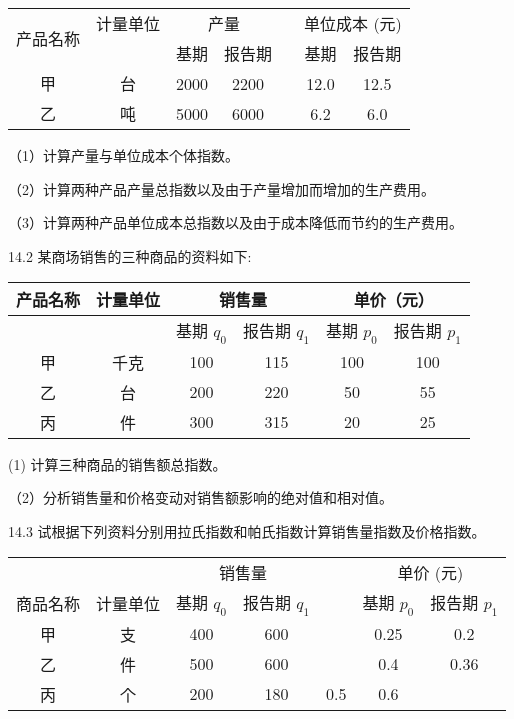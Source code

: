 \documentclass[10pt]{article}
\begin{document}
\begin{CJK*}{UTF8}{bsmi}
\begin{center}
\begin{tabular}{ccccccc}
\hline
\multirow{2}{*}{产品名称} & 计量单位 & \multicolumn{2}{c}{产量} &  & \multicolumn{2}{c}{单位成本 (元)} \\
\cline { 6 - 7 }
 &  & 基期 & 报告期 &  & 基期 & 报告期 \\
\hline
甲 & 台 & 2000 & 2200 &  & 12.0 & 12.5 \\
乙 & 吨 & 5000 & 6000 &  & 6.2 & 6.0 \\
\hline
\end{tabular}
\end{center}

（1）计算产量与单位成本个体指数。

（2）计算两种产品产量总指数以及由于产量增加而增加的生产费用。

（3）计算两种产品单位成本总指数以及由于成本降低而节约的生产费用。

14.2 某商场销售的三种商品的资料如下:

\begin{center}
\begin{tabular}{|c|c|c|c|c|c|}
\hline
\multirow{2}{*}{产品名称} & \multirow{2}{*}{计量单位} & \multicolumn{2}{|c|}{销售量} & \multicolumn{2}{|c|}{单价（元）} \\
\hline
 &  & 基期 $q_{0}$ & 报告期 $q_{1}$ & 基期 $p_{0}$ & 报告期 $p_{1}$ \\
\hline
甲 & 千克 & 100 & 115 & 100 & 100 \\
\hline
乙 & 台 & 200 & 220 & 50 & 55 \\
\hline
丙 & 件 & 300 & 315 & 20 & 25 \\
\hline
\end{tabular}
\end{center}

(1) 计算三种商品的销售额总指数。

（2）分析销售量和价格变动对销售额影响的绝对值和相对值。

14.3 试根据下列资料分别用拉氏指数和帕氏指数计算销售量指数及价格指数。

\begin{center}
\begin{tabular}{ccccccc}
\hline
 &  & \multicolumn{2}{c}{销售量} &  & \multicolumn{2}{c}{单价 (元)} \\
\cline { 6 - 7 }
商品名称 & 计量单位 & 基期 $q_{0}$ & 报告期 $q_{1}$ &  & 基期 $p_{0}$ & 报告期 $p_{1}$ \\
\hline
甲 & 支 & 400 & 600 &  & 0.25 & 0.2 \\
乙 & 件 & 500 & 600 &  & 0.4 & 0.36 \\
丙 & 个 & 200 & 180 & 0.5 & 0.6 &  \\
\hline
\end{tabular}
\end{center}


\end{CJK*}
\end{document}

